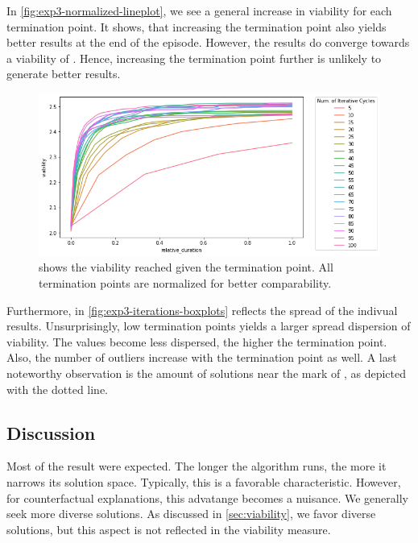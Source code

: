 \documentclass[./../../paper.tex]{subfiles}
\begin{document}
In \autoref{fig:exp3-normalized-lineplot}, we see a general increase in viability for each termination point. It shows, that increasing the termination point also yields better results at the end of the episode. However, the results do converge towards a viability of . Hence, increasing the termination point further is unlikely to generate better results.  

\begin{figure}[htbp]
    \centering
    \includegraphics[width=\textwidth]{figures/generated/exp3_relative_cycles.png}
    \caption{shows the viability reached given the termination point. All termination points are normalized for better comparability.}
    \label{fig:exp3-iterations-boxplots}
\end{figure}


Furthermore, in \autoref{fig:exp3-iterations-boxplots} reflects the spread of the indivual results. Unsurprisingly, low termination points yields a larger spread dispersion of viability. The values become less dispersed, the higher the termination point.  Also, the number of outliers increase with the termination point as well. A last noteworthy observation is the amount of solutions near the mark of , as depicted with the dotted line.

\subsection{Discussion}
Most of the result were expected. The longer the algorithm runs, the more it narrows its solution space. Typically, this is a favorable characteristic. However, for counterfactual explanations, this advatange becomes a nuisance. We generally seek more diverse solutions. As discussed in \autoref{sec:viability}, we favor diverse solutions, but this aspect is not reflected in the viability measure. 
\end{document}
